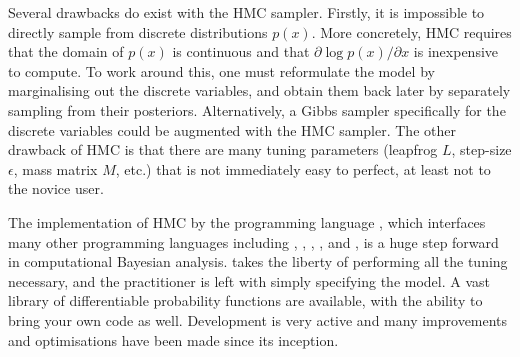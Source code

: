 Several drawbacks do exist with the HMC sampler. Firstly, it is impossible to directly sample from discrete distributions $p(x)$.
More concretely, HMC requires that the domain of $p(x)$ is continuous and that $\partial \log p(x) / \partial x$ is inexpensive to compute.
To work around this, one must reformulate the model by marginalising out the discrete variables, and obtain them back later by separately sampling from their posteriors.
Alternatively, a Gibbs sampler specifically for the discrete variables could be augmented with the HMC sampler.
The other drawback of HMC is that there are many tuning parameters (leapfrog $L$, step-size $\epsilon$, mass matrix $M$, etc.)  that is not immediately easy to perfect, at least not to the novice user. 

The implementation of HMC by the programming language , which interfaces many other programming languages including , , , ,  and , is a huge step forward in computational Bayesian analysis.
 takes the liberty of performing all the tuning necessary, and the practitioner is left with simply specifying the model. 
A vast library of differentiable probability functions are available, with the ability to bring your own code as well.
Development is very active and many improvements and optimisations have been made since its inception.


